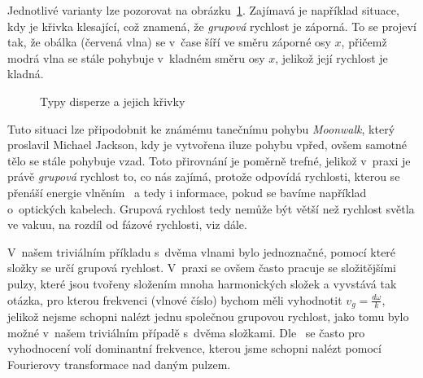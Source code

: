 Jednotlivé varianty lze pozorovat na
obrázku~\ref{fig:dispersion_types}.
Zajímavá je například situace, kdy je křivka
klesající, což znamená, že \textit{grupová}
rychlost je záporná. To se projeví tak, že
obálka (červená vlna) se v~čase šíří ve
směru záporné osy $x$, přičemž modrá vlna
se stále pohybuje v~kladném směru osy $x$,
jelikož její rychlost je kladná.
\begin{figure}[htbp]
\centering
{}
\caption{Typy disperze a jejich křivky}
\label{fig:dispersion_types}
\end{figure}
Tuto situaci
lze připodobnit ke známému tanečnímu pohybu
\textit{Moonwalk}, který proslavil Michael
Jackson, kdy je vytvořena iluze pohybu vpřed,
ovšem samotné tělo se stále pohybuje vzad.
Toto přirovnání je poměrně trefné, jelikož
v~praxi je právě \textit{grupová} rychlost to,
co nás zajímá, protože odpovídá rychlosti,
kterou se přenáší energie
vlněním~\cite{wiki_group_velocity} a tedy i
informace, pokud se bavíme například o~optických
kabelech. Grupová rychlost tedy nemůže být
větší než rychlost světla ve vakuu, na rozdíl
od fázové rychlosti, viz dále.

V~našem triviálním příkladu s~dvěma vlnami
bylo jednoznačné, pomocí které složky se
určí grupová rychlost. V~praxi se ovšem často
pracuje se složitějšími pulzy, které jsou tvořeny
složením mnoha harmonických složek a vyvstává
tak otázka, pro kterou frekvenci (vlnové číslo)
bychom měli vyhodnotit $v_g = \frac{d\omega}{k}$,
jelikož nejsme schopni nalézt jednu společnou
grupovou rychlost, jako tomu bylo možné v~našem
triviálním případě s~dvěma složkami.
Dle~\cite{harvard_disp} se často pro vyhodnocení
volí dominantní frekvence, kterou jsme schopni
nalézt pomocí Fourierovy transformace nad
daným pulzem.

